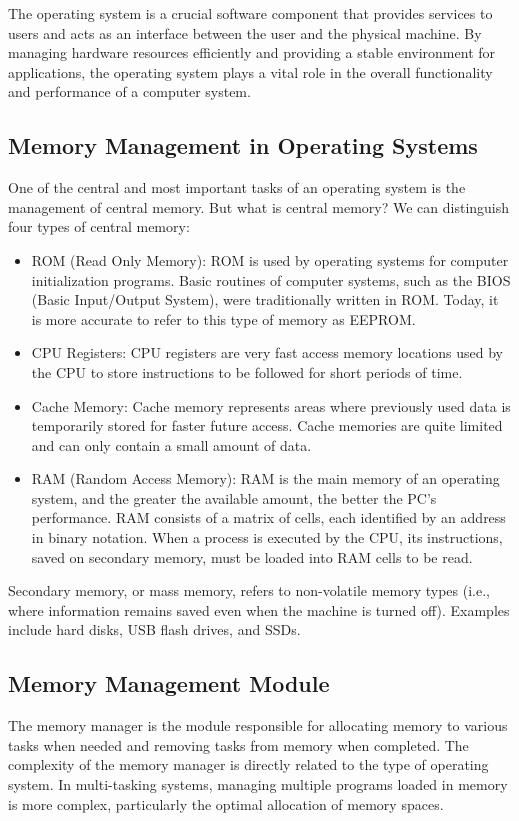 The operating system is a crucial software component that provides services to users and acts as an interface between the user and the physical machine. By managing hardware resources efficiently and providing a stable environment for applications, the operating system plays a vital role in the overall functionality and performance of a computer system.


\subsection{Memory Management in Operating Systems}
One of the central and most important tasks of an operating system is the management of central memory. But what is central memory? We can distinguish four types of central memory:

\begin{itemize}
    \item ROM (Read Only Memory): ROM is used by operating systems for computer initialization programs. Basic routines of computer systems, such as the BIOS (Basic Input/Output System), were traditionally written in ROM. Today, it is more accurate to refer to this type of memory as EEPROM.
    \item CPU Registers: CPU registers are very fast access memory locations used by the CPU to store instructions to be followed for short periods of time.
    \item Cache Memory: Cache memory represents areas where previously used data is temporarily stored for faster future access. Cache memories are quite limited and can only contain a small amount of data.
    \item RAM (Random Access Memory): RAM is the main memory of an operating system, and the greater the available amount, the better the PC's performance. RAM consists of a matrix of cells, each identified by an address in binary notation. When a process is executed by the CPU, its instructions, saved on secondary memory, must be loaded into RAM cells to be read.
\end{itemize}

Secondary memory, or mass memory, refers to non-volatile memory types (i.e., where information remains saved even when the machine is turned off). Examples include hard disks, USB flash drives, and SSDs.


\subsection{Memory Management Module}
The memory manager is the module responsible for allocating memory to various tasks when needed and removing tasks from memory when completed. The complexity of the memory manager is directly related to the type of operating system. In multi-tasking systems, managing multiple programs loaded in memory is more complex, particularly the optimal allocation of memory spaces.

